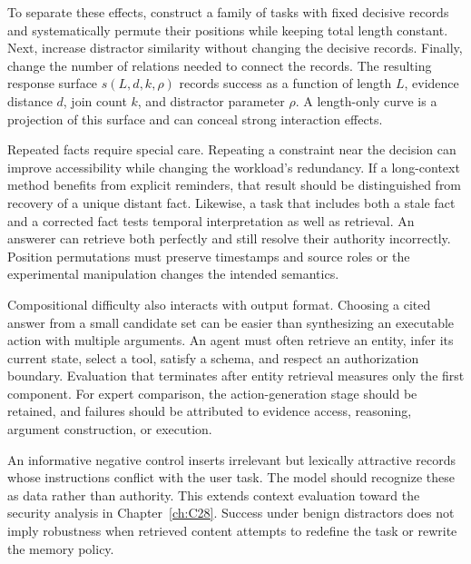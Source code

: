 To separate these effects, construct a family of tasks with fixed decisive records and systematically permute their positions while keeping total length constant. Next, increase distractor similarity without changing the decisive records. Finally, change the number of relations needed to connect the records. The resulting response surface $s(L,d,k,\rho)$ records success as a function of length $L$, evidence distance $d$, join count $k$, and distractor parameter $\rho$. A length-only curve is a projection of this surface and can conceal strong interaction effects.

Repeated facts require special care. Repeating a constraint near the decision can improve accessibility while changing the workload's redundancy. If a long-context method benefits from explicit reminders, that result should be distinguished from recovery of a unique distant fact. Likewise, a task that includes both a stale fact and a corrected fact tests temporal interpretation as well as retrieval. An answerer can retrieve both perfectly and still resolve their authority incorrectly. Position permutations must preserve timestamps and source roles or the experimental manipulation changes the intended semantics.

Compositional difficulty also interacts with output format. Choosing a cited answer from a small candidate set can be easier than synthesizing an executable action with multiple arguments. An agent must often retrieve an entity, infer its current state, select a tool, satisfy a schema, and respect an authorization boundary. Evaluation that terminates after entity retrieval measures only the first component. For expert comparison, the action-generation stage should be retained, and failures should be attributed to evidence access, reasoning, argument construction, or execution.

An informative negative control inserts irrelevant but lexically attractive records whose instructions conflict with the user task. The model should recognize these as data rather than authority. This extends context evaluation toward the security analysis in Chapter~\ref{ch:C28}. Success under benign distractors does not imply robustness when retrieved content attempts to redefine the task or rewrite the memory policy.

